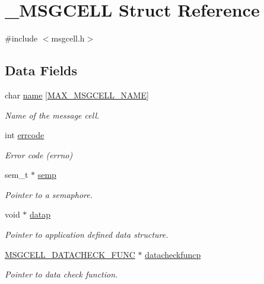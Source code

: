 \hypertarget{struct___m_s_g_c_e_l_l}{\section{\-\_\-\-M\-S\-G\-C\-E\-L\-L Struct Reference}
\label{struct___m_s_g_c_e_l_l}
}


{\ttfamily \#include $<$msgcell.\-h$>$}

\subsection*{Data Fields}
\begin{DoxyCompactItemize}
\item 
char \hyperlink{struct___m_s_g_c_e_l_l_a2e4f41af9ce75df9745b48898bf98a83}{name} \mbox{[}\hyperlink{msgcell_8h_a621fb1215243afbafc8cbc53f7d7641a}{M\-A\-X\-\_\-\-M\-S\-G\-C\-E\-L\-L\-\_\-\-N\-A\-M\-E}\mbox{]}
\begin{DoxyCompactList}\small\item\em Name of the message cell. \end{DoxyCompactList}\item 
int \hyperlink{struct___m_s_g_c_e_l_l_a213ff6a6c12188e0b1f181decf95f6f4}{errcode}
\begin{DoxyCompactList}\small\item\em Error code (errno) \end{DoxyCompactList}\item 
sem\-\_\-t $\ast$ \hyperlink{struct___m_s_g_c_e_l_l_a45cd5bc399af6d5ee57eee563850ebe4}{semp}
\begin{DoxyCompactList}\small\item\em Pointer to a semaphore. \end{DoxyCompactList}\item 
void $\ast$ \hyperlink{struct___m_s_g_c_e_l_l_aeb5cadc7793d3e5ed0c725dbb3c04491}{datap}
\begin{DoxyCompactList}\small\item\em Pointer to application defined data structure. \end{DoxyCompactList}\item 
\hyperlink{msgcell_8h_afb841d6e1bf259250e82b00f304194f7}{M\-S\-G\-C\-E\-L\-L\-\_\-\-D\-A\-T\-A\-C\-H\-E\-C\-K\-\_\-\-F\-U\-N\-C} $\ast$ \hyperlink{struct___m_s_g_c_e_l_l_a6ba9472f22524db3bf5a3fc593b8ae23}{datacheckfuncp}
\begin{DoxyCompactList}\small\item\em Pointer to data check function. \end{DoxyCompactList}\end{DoxyCompactItemize}


